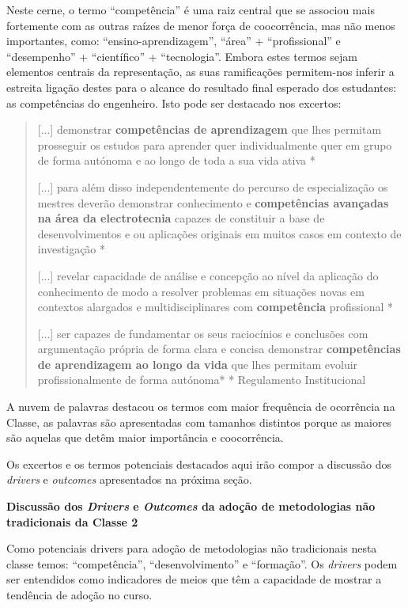 \documentclass{textolivre-html}
\begin{document}
Neste cerne, o termo “competência” é uma raiz central que se associou mais fortemente com as outras raízes de menor força de coocorrência, mas não menos importantes, como: “ensino-aprendizagem”, “área” + “profissional” e “desempenho” + “científico” + “tecnologia”. Embora estes termos sejam elementos centrais da representação, as suas ramificações permitem-nos inferir a estreita ligação destes para o alcance do resultado final esperado dos estudantes: as competências do engenheiro. Isto pode ser destacado nos excertos:

\begin{quote}[...] demonstrar \textbf{competências de aprendizagem} que lhes permitam prosseguir os estudos para aprender quer individualmente quer em grupo de forma autónoma e ao longo de toda a sua vida ativa  *

[...] para além disso independentemente do percurso de especialização os mestres deverão demonstrar conhecimento e \textbf{competências avançadas na área da electrotecnia} capazes de constituir a base de desenvolvimentos e ou aplicações originais em muitos casos em contexto de investigação  *

[...] revelar capacidade de análise e concepção ao nível da aplicação do conhecimento de modo a resolver problemas em situações novas em contextos alargados e multidisciplinares com \textbf{competência} profissional *

[...] ser capazes de fundamentar os seus raciocínios e conclusões com argumentação própria de forma clara e concisa demonstrar \textbf{competências de aprendizagem ao longo da vida} que lhes permitam evoluir profissionalmente de forma autónoma*
* Regulamento Institucional \cite[grifo nosso]{utad2018}
\end{quote}

A nuvem de palavras destacou os termos com maior frequência de ocorrência na Classe, as palavras são apresentadas com tamanhos distintos porque as maiores são aquelas que detêm maior importância e coocorrência.

Os excertos e os termos potenciais destacados aqui irão compor a discussão dos \textit{drivers} e \textit{outcomes} apresentados na próxima seção.

\textbf{Discussão dos \textit{Drivers} e \textit{Outcomes} da adoção de metodologias não tradicionais da Classe 2}

Como potenciais drivers para adoção de metodologias não tradicionais nesta classe temos: “competência”, “desenvolvimento” e “formação”. Os \textit{drivers} podem ser entendidos como indicadores de meios que têm a capacidade de mostrar a tendência de adoção no curso.
\end{document}
